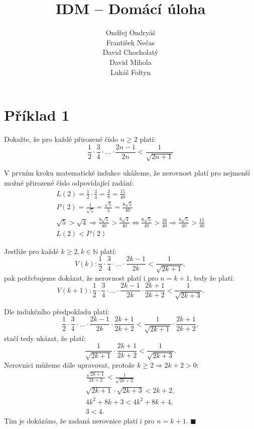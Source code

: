 \documentclass[12pt,a4paper]{article}
\author{Ondřej Ondryáš\\František Nečas\\David Chocholatý\\David Mihola\\Lukáš Foltyn}
\title{IDM – Domácí úloha}
\newcommand{\pageline}{\noindent\makebox[\linewidth]{\rule{\linewidth}{0.4pt}}\vspace{5pt}}
\begin{document}
\maketitle

\setlength\abovedisplayshortskip{10pt}
\setlength\abovedisplayskip{10pt}
\setlength\belowdisplayshortskip{10pt}
\setlength\belowdisplayskip{10pt}

\section*{Příklad 1}

Dokažte, že pro každé přirozené číslo \(n \geq 2\) platí:
\[
	\frac{1}{2} \cdot \frac{3}{4} \cdot ... \cdot \frac{2n-1}{2n} < \frac{1}{\sqrt{2n + 1}}
\]
\pageline

V prvním kroku matematické indukce ukážeme, že nerovnost platí pro nejmenší možné přirozené číslo odpovídající zadání:
\begin{gather*}
	L(2) = \frac{1}{2} \cdot \frac{3}{4} = \frac{3}{8} = \frac{15}{40} \\
    P(2) = \frac{1}{\sqrt{5}} = \frac{\sqrt{5}}{5} = \frac{8\sqrt{5}}{40} \\
    \sqrt{5} > \sqrt{4} \Rightarrow \frac{8\sqrt{5}}{40} > \frac{8\sqrt{4}}{40} \iff \frac{8\sqrt{5}}{40} > \frac{16}{40} \Rightarrow \frac{8\sqrt{5}}{40} > \frac{15}{40} \\
	L(2) < P(2)
\end{gather*}

Jestliže pro každé $k \geq 2, k \in \mathbb{N}$ platí:
\[
    V(k): \frac{1}{2} \cdot \frac{3}{4} \cdot ... \cdot \frac{2k-1}{2k} < \frac{1}{\sqrt{2k + 1}},
\]
pak potřebujeme dokázat, že nerovnost platí i pro $n=k+1$, tedy že platí:
\[
    V(k+1): \frac{1}{2} \cdot \frac{3}{4} \cdot ... \cdot \frac{2k-1}{2k} \cdot \frac{2k+1}{2k+2} < \frac{1}{\sqrt{2k + 3}}.
\]

Dle indukčního předpokladu platí:
\[
    \frac{1}{2} \cdot \frac{3}{4} \cdot ... \cdot \frac{2k-1}{2k} \cdot \frac{2k+1}{2k+2} < \frac{1}{\sqrt{2k + 1}} \cdot \frac{2k+1}{2k + 2},
\]
stačí tedy ukázat, že platí:
\[
    \frac{1}{\sqrt{2k+1}} \cdot \frac{2k+1}{2k+2} < \frac{1}{\sqrt{2k+3}}.
\]
Nerovnici můžeme dále upravovat, protože $k \geq 2 \Rightarrow 2k + 2 > 0$:
\begin{gather*}
    \frac{\sqrt{2k+1}}{2k+2} < \frac{1}{\sqrt{2k+3}} \\
    \sqrt{2k+1} \cdot \sqrt{2k+3} < 2k+2, \\
    4k^2 + 8k + 3 < 4k^2 + 8k + 4, \\
    3 < 4.
\end{gather*}
Tím je dokázáno, že zadaná nerovnice platí i pro $n = k + 1$. $\blacksquare$
\end{document}
